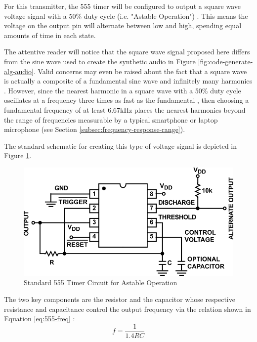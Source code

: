 For this transmitter, the 555 timer will be configured to output a square wave voltage signal with a 50\% duty cycle (i.e. "Astable Operation") \cite{icm7555}.
This means the voltage on the output pin will alternate between low and high, spending equal amounts of time in each state.

The attentive reader will notice that the square wave signal proposed here differs from the sine wave used to create the synthetic audio in Figure \ref{fig:code-generate-alg-audio}.
Valid concerns may even be raised about the fact that a square wave is actually a composite of a fundamental sine wave and infinitely many harmonics \cite{harmonics}.
However, since the nearest harmonic in a square wave with a 50\% duty cycle oscillates at a frequency three times as fast as the fundamental \cite{square-waves}, then choosing a fundamental frequency of at least 6.67kHz places the nearest harmonics beyond the range of frequencies measurable by a typical smartphone or laptop microphone (see Section \ref{subsec:frequency-response-range}).

The standard schematic for creating this type of voltage signal is depicted in Figure \ref{fig:555_astable}.

\begin{figure}[h]
    \centering
    \caption{Standard 555 Timer Circuit for Astable Operation \cite{icm7555}}
    \label{fig:555_astable}
    \includegraphics[width=0.75\linewidth]{Figures/6 PCB Design/555_astable.png}
\end{figure}

The two key components are the resistor  and the capacitor  whose respective resistance and capacitance control the output frequency   via the relation shown in Equation \ref{eq:555-freq} \cite{icm7555}:
\begin{equation}\label{eq:555-freq}
    f = \frac{1}{1.4 R C}
\end{equation}

